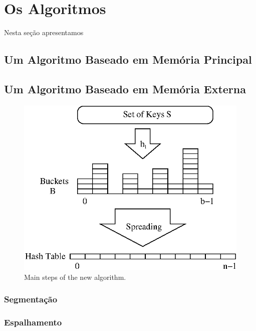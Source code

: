 \section{Os Algoritmos}
\label{sec:thealgorithm}
Nesta se\c{c}\~ao apresentamos
\subsection{Um Algoritmo Baseado em Mem\'oria Principal}

\subsection{Um Algoritmo Baseado em Mem\'oria Externa}
\begin{figure}
\centering
  \includegraphics{figs/brz.ps}
\caption{Main steps of the new algorithm.}
\label{fig:new-algo-main-steps}
\end{figure}

\subsubsection{Segmenta\c{c}\~ao}
\subsubsection{Espalhamento}
